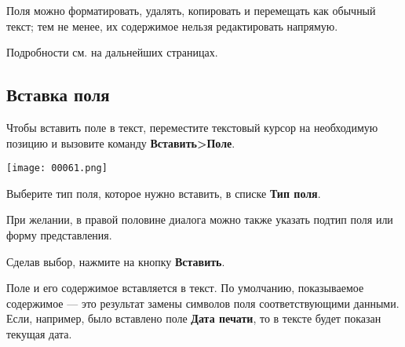 ﻿\documentclass[a4paper,10pt]{article}
\begin{document}
Поля можно форматировать, удалять, копировать и перемещать как обычный текст; тем не менее, их содержимое нельзя редактировать напрямую.

Подробности см. на дальнейших страницах.

\subsection{Вставка поля}
Чтобы вставить поле в текст, переместите текстовый курсор на необходимую позицию и вызовите команду \textbf{Вставить>Поле}.

\texttt{[image: 00061.png]}

Выберите тип поля, которое нужно вставить, в списке \textbf{Тип поля}.

При желании, в правой половине диалога можно также указать подтип поля или форму представления.

Сделав выбор, нажмите на кнопку \textbf{Вставить}.

Поле и его содержимое вставляется в текст. По умолчанию, показываемое содержимое — это результат замены символов поля соответствующими данными. Если, например, было вставлено поле \textbf{Дата печати}, то в тексте будет показан текущая дата.
\end{document}

